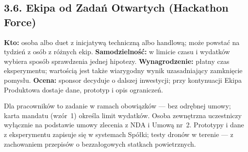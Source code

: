 \documentclass[11pt,a4paper]{report}
\begin{document}
\subsection*{3.6. Ekipa od Zadań Otwartych (Hackathon Force)}
\textbf{Kto:} osoba albo duet z inicjatywą techniczną albo handlową; może powstać na tydzień z osób z różnych ekip. \textbf{Samodzielność:} w limicie czasu i wydatków wybiera sposób sprawdzenia jednej hipotezy. \textbf{Wynagrodzenie:} płatny czas eksperymentu; wartością jest także wiarygodny wynik uzasadniający zamknięcie pomysłu. \textbf{Ocena:} sponsor decyduje o dalszej inwestycji; przy kontynuacji Ekipa Produktowa dostaje dane, prototyp i opis ograniczeń.
\begin{Prawo}
Dla pracowników to zadanie w ramach obowiązków --- bez odrębnej umowy; karta mandatu (wzór~1) określa limit wydatków. Osoba zewnętrzna uczestniczy wyłącznie na podstawie umowy zlecenia z NDA i Umową nr~2. Prototypy i dane z eksperymentu zapisuje się w systemach Spółki; testy dronów w terenie --- z zachowaniem przepisów o bezzałogowych statkach powietrznych.
\end{Prawo}
\end{document}
